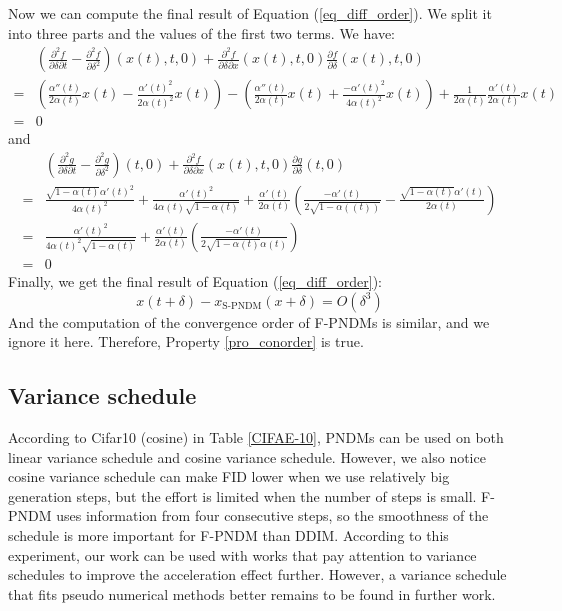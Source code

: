 \documentclass{article}
\begin{document}
Now we can compute the final result of Equation (\ref{eq_diff_order}). We split it into three parts and the values of the first two terms. We have:
\begin{equation}
   \begin{split}
        &(\frac{\partial^2 f}{\partial \delta\partial t}-\frac{\partial^2 f}{\partial \delta^2})(x(t),t,0) +\frac{\partial^2 f}{\partial \delta\partial x}(x(t),t,0)\frac{\partial f}{\partial \delta}(x(t),t,0) \\
       =& \left(\frac{\alpha''(t)}{2\alpha(t)}x(t)-\frac{\alpha'(t)^2}{2\alpha(t)^2}x(t)\right) - \left(\frac{\alpha''(t)}{2\alpha(t)}x(t) + \frac{-\alpha'(t)^2}{4\alpha(t)^2}x(t) \right) + \frac{1}{2\alpha(t)}\frac{\alpha'(t)}{2\alpha(t)}x(t) \\
       =& 0
   \end{split}
\end{equation}
and
\begin{equation}
   \begin{split}
        &(\frac{\partial^2 g}{\partial \delta\partial t}-\frac{\partial^2 g}{\partial \delta^2})(t,0) + \frac{\partial^2 f}{\partial \delta\partial x}(x(t),t,0)\frac{\partial g}{\partial \delta}(t,0) \\
       =&\frac{\sqrt{1-\alpha(t)}\alpha'(t)^2}{4\alpha(t)^2} + \frac{\alpha'(t)^2}{4\alpha(t)\sqrt{1-\alpha(t)}} + \frac{\alpha'(t)}{2\alpha(t)}\left(\frac{-\alpha'(t)}{2\sqrt{1-\alpha((t))}} - \frac{\sqrt{1-\alpha(t)}\alpha'(t)}{2\alpha(t)}\right)\\
       =& \frac{\alpha'(t)^2}{4\alpha(t)^2\sqrt{1-\alpha(t)}} + \frac{\alpha'(t)}{2\alpha(t)}\left(\frac{-\alpha'(t)}{2\sqrt{1-\alpha(t)}\alpha(t)}\right) \\
       =&0
   \end{split}
\end{equation}
Finally, we get the final result of Equation (\ref{eq_diff_order}):
\begin{equation}
   x(t+\delta) - x_{\text{S-PNDM}}(x+\delta) = O(\delta^3)
\end{equation}
And the computation of the convergence order of F-PNDMs is similar, and we ignore it here. Therefore, Property \ref{pro_conorder} is true.


\subsection{Variance schedule}
\label{sec_variance}
According to Cifar10 (cosine) in Table \ref{CIFAE-10}, PNDMs can be used on both linear variance schedule and cosine variance schedule. However, we also notice cosine variance schedule can make FID lower when we use relatively big generation steps, but the effort is limited when the number of steps is small. F-PNDM uses information from four consecutive steps, so the smoothness of the schedule is more important for F-PNDM than DDIM. According to this experiment, our work can be used with works that pay attention to variance schedules to improve the acceleration effect further. However, a variance schedule that fits pseudo numerical methods better remains to be found in further work.
\end{document}

